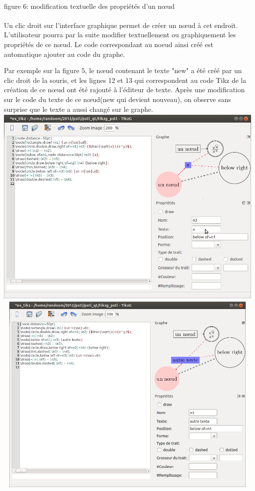 \documentclass[a4paper]{report}
\begin{document}
\\
figure 6: modification textuelle des propriétés d'un n{\oe}ud
\\
\\
Un clic droit sur l'interface graphique permet de créer un n{\oe}ud à cet endroit. L'utilisateur pourra par la suite modifier textuellement ou graphiquement les propriétés de ce n{\oe}ud. Le code correspondant au noeud ainsi créé est automatique ajouter au code du graphe. 

Par exemple sur la figure 5, le n{\oe}ud contenant le texte "new" a été créé par un clic droit de la souris, et les  lignes 12 et 13 qui correspondent au code Tikz de la création de ce n{\oe}ud ont été rajouté à l'éditeur de texte. Après une modification sur le code du texte de ce n{\oe}ud(new qui devient nouveau), on observe sans surprise que le texte a aussi changé sur le graphe.
\newline
  \includegraphics[width=15cm, height=10cm]{img/r_8.png} 
\\
  \includegraphics[width=15cm, height=10cm]{img/r_9.png}
\end{document}

